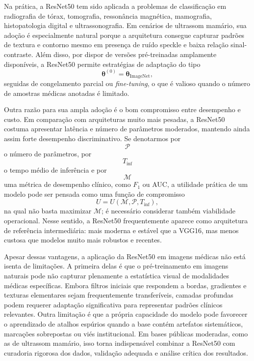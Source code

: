 \documentclass[tcc,capa]{texufpel}
\begin{document}
Na prática, a ResNet50 tem sido aplicada a problemas de classificação em radiografia de tórax, tomografia, ressonância magnética, mamografia, histopatologia digital e ultrassonografia. Em cenários de ultrassom mamário, sua adoção é especialmente natural porque a arquitetura consegue capturar padrões de textura e contorno mesmo em presença de ruído speckle e baixa relação sinal-contraste. Além disso, por dispor de versões pré-treinadas amplamente disponíveis, a ResNet50 permite estratégias de adaptação do tipo
\begin{equation}
	\boldsymbol{\theta}^{(0)} = \boldsymbol{\theta}_{\text{ImageNet}},
\end{equation}
seguidas de congelamento parcial ou \textit{fine-tuning}, o que é valioso quando o número de amostras médicas anotadas é limitado.

Outra razão para sua ampla adoção é o bom compromisso entre desempenho e custo. Em comparação com arquiteturas muito mais pesadas, a ResNet50 costuma apresentar latência e número de parâmetros moderados, mantendo ainda assim forte desempenho discriminativo. Se denotarmos por
\begin{equation}
	\mathcal{P}
\end{equation}
o número de parâmetros, por
\begin{equation}
	T_{\text{inf}}
\end{equation}
o tempo médio de inferência e por
\begin{equation}
	\mathcal{M}
\end{equation}
uma métrica de desempenho clínico, como \(F_1\) ou AUC, a utilidade prática de um modelo pode ser pensada como uma função de compromisso
\begin{equation}
	U = U(\mathcal{M}, \mathcal{P}, T_{\text{inf}}),
\end{equation}
na qual não basta maximizar \(\mathcal{M}\); é necessário considerar também viabilidade operacional. Nesse sentido, a ResNet50 frequentemente aparece como arquitetura de referência intermediária: mais moderna e estável que a VGG16, mas menos custosa que modelos muito mais robustos e recentes.

Apesar dessas vantagens, a aplicação da ResNet50 em imagens médicas não está isenta de limitações. A primeira delas é que o pré-treinamento em imagens naturais pode não capturar plenamente a estatística visual de modalidades médicas específicas. Embora filtros iniciais que respondem a bordas, gradientes e texturas elementares sejam frequentemente transferíveis, camadas profundas podem requerer adaptação significativa para representar padrões clínicos relevantes. Outra limitação é que a própria capacidade do modelo pode favorecer o aprendizado de atalhos espúrios quando a base contém artefatos sistemáticos, marcações sobrepostas ou viés institucional. Em bases públicas moderadas, como as de ultrassom mamário, isso torna indispensável combinar a ResNet50 com curadoria rigorosa dos dados, validação adequada e análise crítica dos resultados.
\end{document}
